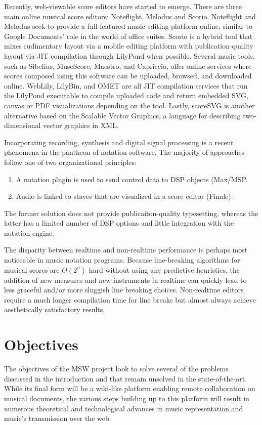\documentclass{article}
\begin{document}
Recently, web-viewable score editors have started to emerge. There are three
main online musical score editors: Noteflight, Melodus and Scorio.
Noteflight and Melodus seek to provide a full-featured music editing
platform online, similar to Google Documents’ role in the world of office
suites. Scorio is a hybrid tool that mixes rudimentary layout via a mobile
editing platform with publication-quality layout via JIT compilation through
LilyPond when possible. Several music tools, such as Sibelius, MuseScore,
Maestro, and Capriccio, offer online services where scores composed using
this software can be uploaded, browsed, and downloaded online. WebLily,
LilyBin, and OMET are all JIT compilation services that run the LilyPond
executable to compile uploaded code and return embedded SVG, canvas or PDF
visualizations depending on the tool. Lastly, scoreSVG is another
alternative based on the Scalable Vector Graphics, a language for describing
two-\-di\-men\-sion\-al vector graphics in XML.

Incorporating recording, synthesis and digital signal processing is a recent
phenomena in the pantheon of notation software.  The majority of approaches
follow one of two organizational principles:
\begin{enumerate}
\item A notation plugin is used to send control data to DSP objects (Max/MSP.
\item Audio is linked to staves that are visualized in a score editor
(Finale).
\end{enumerate}
The former solution does not provide publicaiton-quality typesetting,
whereas the latter has a limited number of DSP options and little
integration with the notation engine.

The disparity between realtime and non-realtime performance is perhaps most
noticeable in music notation programs. Because line-breaking algorithms for
musical scores are $O(2^n)$ hard without using any predictive heuristics, the
addition of new measures and new instruments in realtime can quickly lead to
less graceful and/or more sluggish line breaking choices. Non-realtime
editors require a much longer compilation time for line breaks but almost
always achieve aesthetically satisfactory results.



\section{Objectives}\label{sec:objectives}
The objectives of the MSW project look to solve several of the problems
discussed in the introduction and that remain unsolved in the
state-of-the-art. While its final form will be a wiki-like platform enabling
remote collaboration on musical documents, the various steps building up to
this platform will result in numerous theoretical and technological advances
in music representation and music's transmission over the web.
\end{document}
